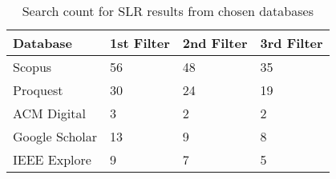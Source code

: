 \begin{table}[h!]
    \begin{center}
        \caption{Search count for SLR results from chosen databases}
        \label{tab:SLR_Count}
        \begin{tabular}{l|l|l|l} %
            \textbf{Database} & \textbf{1st Filter} & \textbf{2nd Filter} & \textbf{3rd Filter} \\
            \hline
            Scopus            & 56                  & 48                  & 35                  \\
            \hline
            Proquest          & 30                  & 24                  & 19                  \\
            \hline
            ACM Digital       & 3                   & 2                   & 2                   \\
            \hline
            Google Scholar    & 13                  & 9                   & 8                   \\
            \hline
            IEEE Explore      & 9                   & 7                   & 5                   \\
        \end{tabular}
    \end{center}
\end{table}


